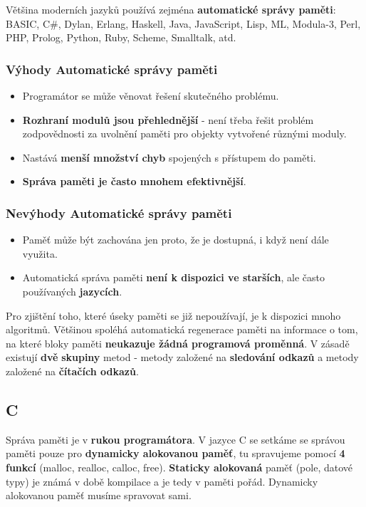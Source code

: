 Většina moderních jazyků používá zejména \textbf{automatické správy paměti}: BASIC, C\#, Dylan, Erlang, Haskell, Java, JavaScript, Lisp, ML, Modula-3, Perl, PHP, Prolog, Python, Ruby, Scheme, Smalltalk, atd.

\subsubsection*{Výhody Automatické správy paměti}
\begin{itemize}
\item Programátor se může věnovat řešení skutečného problému.
\item \textbf{Rozhraní modulů jsou přehlednější} - není třeba řešit problém zodpovědnosti za uvolnění paměti pro objekty vytvořené různými moduly.
\item Nastává \textbf{menší množství chyb} spojených s přístupem do paměti.
\item \textbf{Správa paměti je často mnohem efektivnější}.
\end{itemize}

\subsubsection*{Nevýhody Automatické správy paměti}
\begin{itemize}
\item Paměť může být zachována jen proto, že je dostupná, i když není dále využita.
\item Automatická správa paměti \textbf{není k dispozici ve starších}, ale často používaných \textbf{jazycích}.
\end{itemize}

Pro zjištění toho, které úseky paměti se již nepoužívají, je k dispozici mnoho algoritmů. Většinou spoléhá automatická regenerace paměti na informace o tom, na které bloky paměti \textbf{neukazuje žádná programová proměnná}. V zásadě existují \textbf{dvě} \textbf{skupiny} metod - metody založené na \textbf{sledování odkazů} a metody založené na \textbf{čítačích odkazů}.

\subsection{C}
Správa paměti je v \textbf{rukou programátora}. V jazyce C se setkáme se správou paměti pouze pro \textbf{dynamicky alokovanou paměť}, tu spravujeme pomocí \textbf{4 funkcí} (malloc, realloc, calloc, free). \textbf{Staticky alokovaná} paměť (pole, datové typy) je známá v době kompilace a je tedy v paměti pořád. Dynamicky alokovanou paměť musíme spravovat sami.

